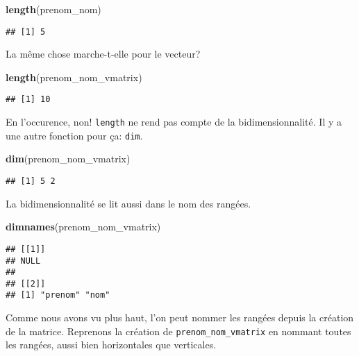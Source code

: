\documentclass[]{book}
\newenvironment{Shaded}{\begin{snugshade}}{\end{snugshade}}
\newcommand{\KeywordTok}[1]{\textcolor[rgb]{0.13,0.29,0.53}{\textbf{#1}}}
\newcommand{\NormalTok}[1]{#1}
\begin{document}
\begin{Shaded}
\begin{Highlighting}[]
\KeywordTok{length}\NormalTok{(prenom_nom)}
\end{Highlighting}
\end{Shaded}

\begin{verbatim}
## [1] 5
\end{verbatim}

La même chose marche-t-elle pour le vecteur?

\begin{Shaded}
\begin{Highlighting}[]
\KeywordTok{length}\NormalTok{(prenom_nom_vmatrix)}
\end{Highlighting}
\end{Shaded}

\begin{verbatim}
## [1] 10
\end{verbatim}

En l'occurence, non! \texttt{length} ne rend pas compte de la
bidimensionnalité. Il y a une autre fonction pour ça: \texttt{dim}.

\begin{Shaded}
\begin{Highlighting}[]
\KeywordTok{dim}\NormalTok{(prenom_nom_vmatrix)}
\end{Highlighting}
\end{Shaded}

\begin{verbatim}
## [1] 5 2
\end{verbatim}

La bidimensionnalité se lit aussi dans le nom des rangées.

\begin{Shaded}
\begin{Highlighting}[]
\KeywordTok{dimnames}\NormalTok{(prenom_nom_vmatrix)}
\end{Highlighting}
\end{Shaded}

\begin{verbatim}
## [[1]]
## NULL
## 
## [[2]]
## [1] "prenom" "nom"
\end{verbatim}

Comme nous avons vu plus haut, l'on peut nommer les rangées depuis la
création de la matrice. Reprenons la création de
\texttt{prenom\_nom\_vmatrix} en nommant toutes les rangées, aussi bien
horizontales que verticales.
\end{document}
